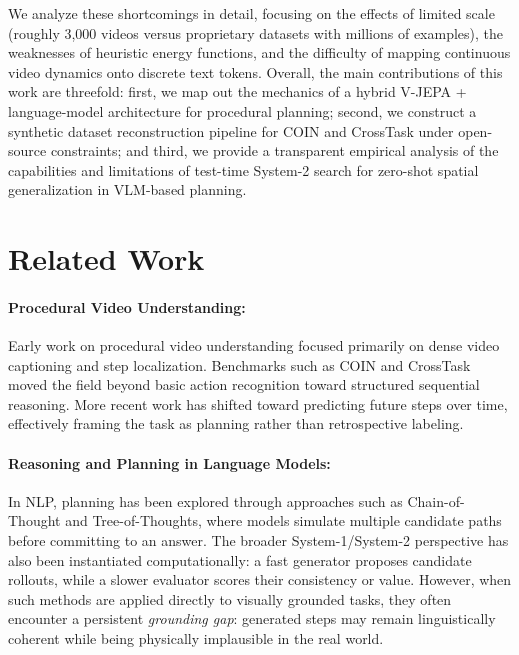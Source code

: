 \documentclass{article}
\begin{document}
We analyze these shortcomings in detail, focusing on the effects of limited scale (roughly 3,000 videos versus proprietary datasets with millions of examples), the weaknesses of heuristic energy functions, and the difficulty of mapping continuous video dynamics onto discrete text tokens. Overall, the main contributions of this work are threefold: first, we map out the mechanics of a hybrid V-JEPA + language-model architecture for procedural planning; second, we construct a synthetic dataset reconstruction pipeline for COIN and CrossTask under open-source constraints; and third, we provide a transparent empirical analysis of the capabilities and limitations of test-time System-2 search for zero-shot spatial generalization in VLM-based planning.

\section{Related Work}

\paragraph{Procedural Video Understanding:}
Early work on procedural video understanding focused primarily on dense video captioning and step localization. Benchmarks such as COIN \citep{tang2019coin} and CrossTask \citep{zhukov2019crossTask} moved the field beyond basic action recognition toward structured sequential reasoning. More recent work has shifted toward predicting future steps over time, effectively framing the task as planning rather than retrospective labeling.

\paragraph{Reasoning and Planning in Language Models:}
In NLP, planning has been explored through approaches such as Chain-of-Thought and Tree-of-Thoughts, where models simulate multiple candidate paths before committing to an answer. The broader System-1/System-2 perspective has also been instantiated computationally: a fast generator proposes candidate rollouts, while a slower evaluator scores their consistency or value. However, when such methods are applied directly to visually grounded tasks, they often encounter a persistent \textit{grounding gap}: generated steps may remain linguistically coherent while being physically implausible in the real world.
\end{document}
